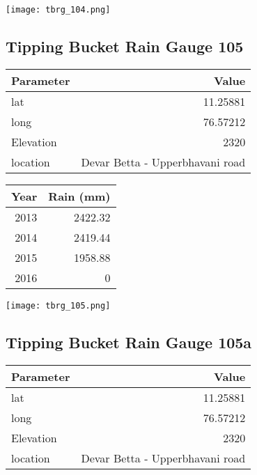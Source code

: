 \documentclass[a4paper]{article}
\begin{document}
\begin{center}
\texttt{[image: tbrg\_104.png]}
\end{center}

\newpage

\subsection*{Tipping Bucket Rain Gauge 105}
\label{sec:orga7d17ba}

\begin{center}
\begin{tabular}{lr}
Parameter & Value\\
\hline
lat & 11.25881\\
long & 76.57212\\
Elevation & 2320\\
location & Devar Betta - Upperbhavani road\\
\end{tabular}
\end{center}

\begin{center}
\begin{tabular}{rr}
Year & Rain (mm)\\
\hline
2013 & 2422.32\\
2014 & 2419.44\\
2015 & 1958.88\\
2016 & 0\\
\end{tabular}
\end{center}

\begin{center}
\texttt{[image: tbrg\_105.png]}
\end{center}

\newpage

\subsection*{Tipping Bucket Rain Gauge 105a}
\label{sec:orga3b68a6}

\begin{center}
\begin{tabular}{lr}
Parameter & Value\\
\hline
lat & 11.25881\\
long & 76.57212\\
Elevation & 2320\\
location & Devar Betta - Upperbhavani road\\
\end{tabular}
\end{center}
\end{document}
